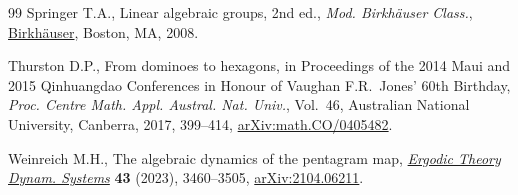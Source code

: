 \documentclass[pdftex]{sigma}
\numberwithin{equation}{section}
\begin{document}
\begin{thebibliography}{99}
Springer T.A., Linear algebraic groups, 2nd ed., \textit{Mod. Birkh\"auser Class.},
 \href{https://doi.org/10.1007/978-0-8176-4840-4}{Birkh\"auser}, Boston, MA,
 2008.

Thurston D.P., From dominoes to hexagons, in Proceedings of the 2014 {M}aui and
 2015 {Q}inhuangdao Conferences in Honour of {V}aughan {F}.{R}.~{J}ones' 60th
 Birthday, \textit{Proc. Centre Math. Appl. Austral. Nat. Univ.}, Vol.~46,
 Australian National University, Canberra, 2017, 399--414,
 \href{http://arxiv.org/abs/math.CO/0405482}{arXiv:math.CO/0405482}.

Weinreich M.H., The algebraic dynamics of the pentagram map,
 \href{https://doi.org/10.1017/etds.2022.82}{\textit{Ergodic Theory Dynam.
 Systems}} \textbf{43} (2023), 3460--3505,
 \href{http://arxiv.org/abs/2104.06211}{arXiv:2104.06211}.

\end{thebibliography}\LastPageEnding
\end{document}
